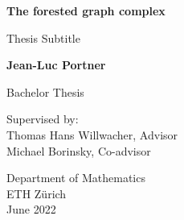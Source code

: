 \begin{titlepage}
   \begin{center}
       \vspace*{4cm}

       \textbf{The forested graph complex}

       \vspace{0.5cm}
        Thesis Subtitle
            
       \vspace{1.5cm}

       \textbf{Jean-Luc Portner}

	   \vspace{0.8cm}
            
       Bachelor Thesis
       
       \vspace{0.5cm}
       
       Supervised by:\\
	   Thomas Hans Willwacher, Advisor\\
	   Michael Borinsky, Co-advisor
            
       \vfill
     
       Department of Mathematics\\
       ETH Zürich\\
       June 2022
            
   \end{center}
\end{titlepage}
